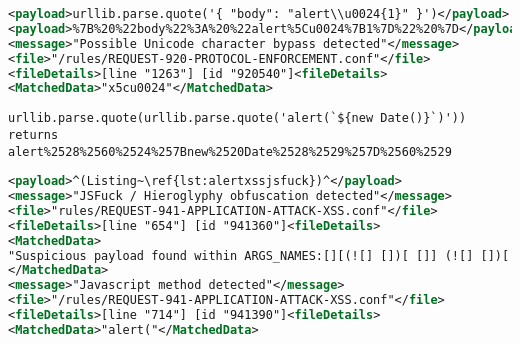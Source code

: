 \begin{lstlisting}[style=ruleStyle, language=XML, caption=unicode escape in json with additional percent encoding, label={lst:jsonunicodeurlenctest}]
<payload>urllib.parse.quote('{ "body": "alert\\u0024{1}" }')</payload>
<payload>%7B%20%22body%22%3A%20%22alert%5Cu0024%7B1%7D%22%20%7D</payload>
<message>"Possible Unicode character bypass detected"</message>
<file>"/rules/REQUEST-920-PROTOCOL-ENFORCEMENT.conf"</file>
<fileDetails>[line "1263"] [id "920540"]<fileDetails>
<MatchedData>"x5cu0024"</MatchedData>
\end{lstlisting}

\begin{lstlisting}[style=basicStyle, caption=url encoded example pass, label={lst:doublepercentencoding}]
urllib.parse.quote(urllib.parse.quote('alert(`${new Date()}`)'))
returns
alert%2528%2560%2524%257Bnew%2520Date%2528%2529%257D%2560%2529
\end{lstlisting}

\begin{lstlisting}[style=ruleStyle, language=XML, caption=alert('XSS') in JSFuck blocked, label={lst:alertxssjsfuckblocked}]
<payload>^(Listing~\ref{lst:alertxssjsfuck})^</payload>
<message>"JSFuck / Hieroglyphy obfuscation detected"</message>
<file>"rules/REQUEST-941-APPLICATION-ATTACK-XSS.conf"</file>
<fileDetails>[line "654"] [id "941360"]<fileDetails>
<MatchedData>
"Suspicious payload found within ARGS_NAMES:[][(![] [])[ []] (![] [])[! [] ! []] (![] [])[ ! []] (!![] [])[ []]][([][(![] [])[ []] (![] [])[! [] ! []] (![] [])[ ! []] (!![] [])[ []]] [])[ (11337 characters omitted)"
</MatchedData>
<message>"Javascript method detected"</message>
<file>"/rules/REQUEST-941-APPLICATION-ATTACK-XSS.conf"</file>
<fileDetails>[line "714"] [id "941390"]<fileDetails>
<MatchedData>"alert("</MatchedData>
\end{lstlisting}

